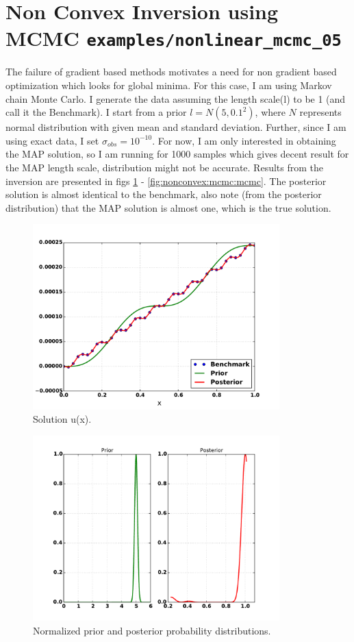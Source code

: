 \documentclass[%
notitlepage,
]{revtex4-1}
\begin{document}
\section{Non Convex Inversion using MCMC \texttt{examples/nonlinear\_mcmc\_05}}
The failure of gradient based methods motivates a need for non gradient based optimization which looks for global minima. For this case, I am using Markov chain Monte Carlo. I generate the data assuming the length scale(l) to be 1 (and call it the Benchmark). I start from a prior $l = N(5, 0.1^2)$, where $N$ represents normal distribution with given mean and standard deviation. Further, since I am using exact data, I set $\sigma_{obs} = 10^{-10}$. For now, I am only interested in obtaining the MAP solution, so I am running for 1000 samples which gives decent result for the MAP length scale, distribution might not be accurate. Results from the inversion are presented in figs \ref{fig:nonconvex:mcmc:u} - \ref{fig:nonconvex:mcmc:mcmc}. The posterior solution is almost identical to the benchmark, also note (from the posterior distribution) that the MAP solution is almost one, which is the true solution.
\begin{figure}[!h]
	\includegraphics[width=0.85\textwidth]{figures/nonlinear_mcmc_05/u.pdf}
    \caption{Solution u(x).}
    \label{fig:nonconvex:mcmc:u}
\end{figure}

\begin{figure}[!h]
	\includegraphics[width=0.85\textwidth]{figures/nonlinear_mcmc_05/pdfs.pdf}
    \caption{Normalized prior and posterior probability distributions.}
    \label{fig:nonconvex:mcmc:pdfs}
\end{figure}
\end{document}
